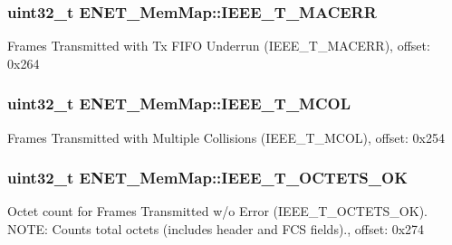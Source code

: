 \subsubsection[{I\+E\+E\+E\+\_\+\+T\+\_\+\+M\+A\+C\+E\+R\+R}]{\setlength{\rightskip}{0pt plus 5cm}uint32\+\_\+t E\+N\+E\+T\+\_\+\+Mem\+Map\+::\+I\+E\+E\+E\+\_\+\+T\+\_\+\+M\+A\+C\+E\+R\+R}\label{struct_e_n_e_t___mem_map_ad63449bac67967063a21e655cccb1d9e}
Frames Transmitted with Tx F\+I\+F\+O Underrun (I\+E\+E\+E\+\_\+\+T\+\_\+\+M\+A\+C\+E\+R\+R), offset\+: 0x264 \hypertarget{struct_e_n_e_t___mem_map_aadeed23e91824e1684a1df65ae3092a0}{}
\subsubsection[{I\+E\+E\+E\+\_\+\+T\+\_\+\+M\+C\+O\+L}]{\setlength{\rightskip}{0pt plus 5cm}uint32\+\_\+t E\+N\+E\+T\+\_\+\+Mem\+Map\+::\+I\+E\+E\+E\+\_\+\+T\+\_\+\+M\+C\+O\+L}\label{struct_e_n_e_t___mem_map_aadeed23e91824e1684a1df65ae3092a0}
Frames Transmitted with Multiple Collisions (I\+E\+E\+E\+\_\+\+T\+\_\+\+M\+C\+O\+L), offset\+: 0x254 \hypertarget{struct_e_n_e_t___mem_map_a0041ed999cf52d11eabf879c2167c353}{}
\subsubsection[{I\+E\+E\+E\+\_\+\+T\+\_\+\+O\+C\+T\+E\+T\+S\+\_\+\+O\+K}]{\setlength{\rightskip}{0pt plus 5cm}uint32\+\_\+t E\+N\+E\+T\+\_\+\+Mem\+Map\+::\+I\+E\+E\+E\+\_\+\+T\+\_\+\+O\+C\+T\+E\+T\+S\+\_\+\+O\+K}\label{struct_e_n_e_t___mem_map_a0041ed999cf52d11eabf879c2167c353}
Octet count for Frames Transmitted w/o Error (I\+E\+E\+E\+\_\+\+T\+\_\+\+O\+C\+T\+E\+T\+S\+\_\+\+O\+K). N\+O\+T\+E\+: Counts total octets (includes header and F\+C\+S fields)., offset\+: 0x274 \hypertarget{struct_e_n_e_t___mem_map_a13fe42ca63a29e999abba2172d85f399}{}
